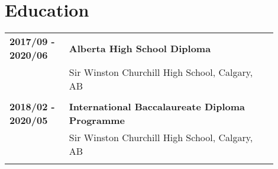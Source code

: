 \documentclass[letterpaper]{article}
\begin{document}
    \section*{Education}
        \begin{tabular}{p{0.2\linewidth}p{0.7\linewidth}} 
            \textbf{2017/09 - 2020/06} & \large\textbf{Alberta High School Diploma} \\
            & Sir Winston Churchill High School, Calgary, AB \\
            \\
            \textbf{2018/02 - 2020/05} & \large\textbf{International Baccalaureate Diploma Programme} \\
            & Sir Winston Churchill High School, Calgary, AB \\
            \\
        \end{tabular}
\end{document}
